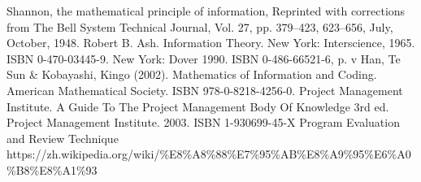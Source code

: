 \documentclass[12pt,a4paper,]{article}
\begin{document}
\begin{thebibliography}{}
\bibitem  Shannon, the mathematical principle of information, Reprinted with corrections from The Bell System Technical Journal, Vol. 27, pp. 379–423, 623–656, July, October, 1948.
\bibitem Robert B. Ash. Information Theory. New York: Interscience, 1965. ISBN 0-470-03445-9. New York: Dover 1990. ISBN 0-486-66521-6, p. v
\bibitem  Han, Te Sun \& Kobayashi, Kingo (2002). Mathematics of Information and Coding. American Mathematical Society. ISBN 978-0-8218-4256-0.
\bibitem  Project Management Institute. A Guide To The Project Management Body Of Knowledge 3rd ed. Project Management Institute. 2003. ISBN 1-930699-45-X
\bibitem Program Evaluation and Review Technique https://zh.wikipedia.org/wiki/\%E8\%A8\%88\%E7\%95\%AB\%E8\%A9\%95\%E6\%A0\%B8\%E8\%A1\%93

\end{thebibliography}
\end{document}
